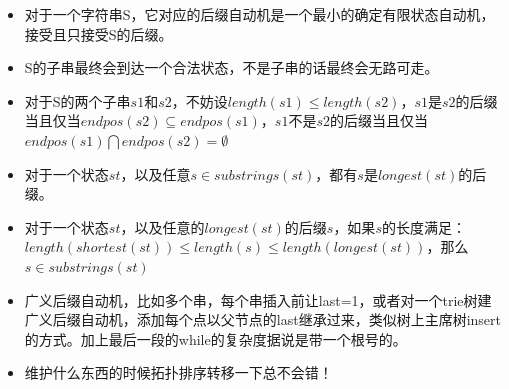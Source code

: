 \documentclass[UTF8,a4paper,titlepage]{ctexart}
\begin{document}
\begin{itemize}
	\item 对于一个字符串S，它对应的后缀自动机是一个最小的确定有限状态自动机，接受且只接受S的后缀。
	\item S的子串最终会到达一个合法状态，不是子串的话最终会无路可走。
	\item 对于S的两个子串$s1$和$s2$，不妨设$length(s1) \leq length(s2)$，$s1$是$s2$的后缀当且仅当$endpos(s2) \subseteq endpos(s1)$，$s1$不是$s2$的后缀当且仅当$endpos(s1) \bigcap endpos(s2) = \emptyset$
	\item 对于一个状态$st$，以及任意$s \in substrings(st)$，都有$s$是$longest(st)$的后缀。
	\item 对于一个状态$st$，以及任意的$longest(st)$的后缀$s$，如果$s$的长度满足：$length(shortest(st)) \leq length(s) \leq length(longest(st))$，那么$s \in substrings(st)$
	\item 广义后缀自动机，比如多个串，每个串插入前让last=1，或者对一个trie树建广义后缀自动机，添加每个点以父节点的last继承过来，类似树上主席树insert的方式。加上最后一段的while的复杂度据说是带一个根号的。
	\item 维护什么东西的时候拓扑排序转移一下总不会错！
\end{itemize}
\end{document}

